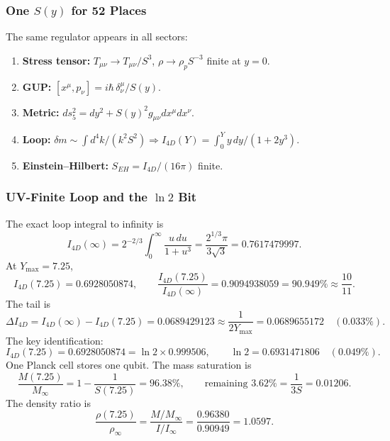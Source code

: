 \documentclass[12pt,oneside,openany]{book}
\begin{document}
\subsubsection{One \(S(y)\) for 52 Places}
\label{sssec:one_S}
The same regulator appears in all sectors:
\begin{enumerate}
\item \textbf{Stress tensor:} \(T_{\mu\nu} \to T_{\mu\nu}/S^3\), \(\rho \to \rho_p S^{-3}\) finite at \(y = 0\).
\item \textbf{GUP:} \([x^\mu, p_\nu] = i\hbar\,\delta^\mu_\nu / S(y)\).
\item \textbf{Metric:} \(ds_5^2 = dy^2 + S(y)^2 g_{\mu\nu}dx^\mu dx^\nu\).
\item \textbf{Loop:} \(\delta m \sim \int d^4k / (k^2 S^2) \Rightarrow I_{4D}(Y) = \int_0^Y y\,dy/(1+2y^3)\).
\item \textbf{Einstein--Hilbert:} \(S_{EH} = I_{4D}/(16\pi)\) finite.
\end{enumerate}

\subsubsection{UV-Finite Loop and the \(\ln 2\) Bit}
\label{sssec:ln2_bit}
The exact loop integral to infinity is
\begin{equation}
I_{4D}(\infty) = 2^{-2/3}\int_0^\infty \frac{u\,du}{1+u^3} = \frac{2^{1/3}\pi}{3\sqrt{3}} = 0.7617479997.
\label{eq:I_inf}
\end{equation}
At \(Y_{\max} = 7.25\),
\begin{equation}
I_{4D}(7.25) = 0.6928050874, \qquad \frac{I_{4D}(7.25)}{I_{4D}(\infty)} = 0.9094938059 = 90.949\% \approx \frac{10}{11}.
\label{eq:I_725}
\end{equation}
The tail is
\begin{equation}
\Delta I_{4D} = I_{4D}(\infty) - I_{4D}(7.25) = 0.0689429123 \approx \frac{1}{2Y_{\max}} = 0.0689655172 \quad (0.033\%).
\label{eq:tail}
\end{equation}
The key identification:
\begin{equation}
I_{4D}(7.25) = 0.6928050874 = \ln 2 \times 0.999506, \qquad \ln 2 = 0.6931471806 \quad (0.049\%).
\label{eq:ln2_identification}
\end{equation}
One Planck cell stores one qubit. The mass saturation is
\begin{equation}
\frac{M(7.25)}{M_\infty} = 1 - \frac{1}{S(7.25)} = 96.38\%, \qquad \text{remaining } 3.62\% = \frac{1}{3S} = 0.01206.
\label{eq:mass_saturation}
\end{equation}
The density ratio is
\begin{equation}
\frac{\rho(7.25)}{\rho_\infty} = \frac{M/M_\infty}{I/I_\infty} = \frac{0.96380}{0.90949} = 1.0597.
\label{eq:density_ratio}
\end{equation}
\end{document}
